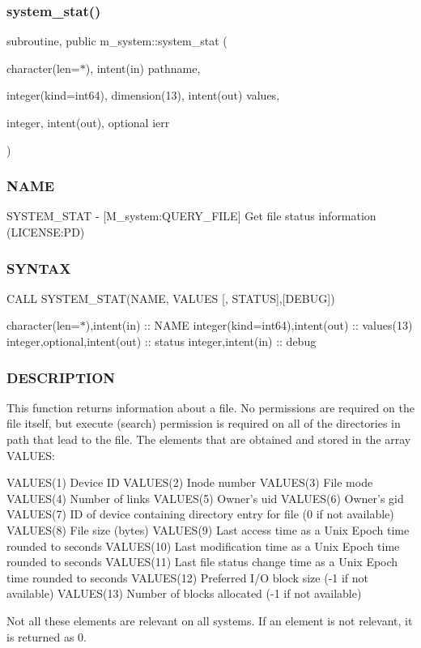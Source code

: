 \subsubsection{\texorpdfstring{system\+\_\+stat()}{system\_stat()}}
{\footnotesize\ttfamily subroutine, public m\+\_\+system\+::system\+\_\+stat (\begin{DoxyParamCaption}\item[{character(len=$\ast$), intent(in)}]{pathname,  }\item[{integer(kind=int64), dimension(13), intent(out)}]{values,  }\item[{integer, intent(out), optional}]{ierr }\end{DoxyParamCaption})}



\subsubsection*{N\+A\+ME}

S\+Y\+S\+T\+E\+M\+\_\+\+S\+T\+AT -\/ \mbox{[}M\+\_\+system\+:Q\+U\+E\+R\+Y\+\_\+\+F\+I\+LE\mbox{]} Get file status information (L\+I\+C\+E\+N\+SE\+:PD) 

\subsubsection*{S\+Y\+N\+T\+AX}

C\+A\+LL S\+Y\+S\+T\+E\+M\+\_\+\+S\+T\+A\+T(\+N\+A\+M\+E, V\+A\+L\+U\+E\+S \mbox{[}, S\+T\+A\+T\+U\+S\mbox{]},\mbox{[}\+D\+E\+B\+U\+G\mbox{]})

character(len=$\ast$),intent(in) \+:\+: N\+A\+ME integer(kind=int64),intent(out) \+:\+: values(13) integer,optional,intent(out) \+:\+: status integer,intent(in) \+:\+: debug

\subsubsection*{D\+E\+S\+C\+R\+I\+P\+T\+I\+ON}

\begin{DoxyVerb}This function returns information about a file. No permissions are
required on the file itself, but execute (search) permission is required
on all of the directories in path that lead to the file. The elements
that are obtained and stored in the array VALUES:

   VALUES(1) Device ID
   VALUES(2) Inode number
   VALUES(3) File mode
   VALUES(4) Number of links
   VALUES(5) Owner's uid
   VALUES(6) Owner's gid
   VALUES(7) ID of device containing directory entry for file (0 if not available)
   VALUES(8) File size (bytes)
   VALUES(9) Last access time as a Unix Epoch time rounded to seconds
   VALUES(10) Last modification time as a Unix Epoch time rounded to seconds
   VALUES(11) Last file status change time as a Unix Epoch time rounded to seconds
   VALUES(12) Preferred I/O block size (-1 if not available)
   VALUES(13) Number of blocks allocated (-1 if not available)

Not all these elements are relevant on all systems. If an element is
not relevant, it is returned as 0.
\end{DoxyVerb}


